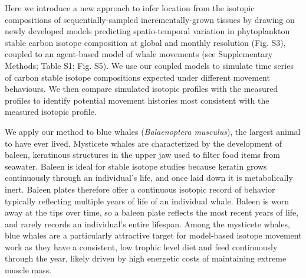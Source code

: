 \documentclass[a4paper,12pt]{article}
\begin{document}
Here we introduce a new approach to infer location from the isotopic compositions of sequentially-sampled incrementally-grown tissues by drawing on newly developed models predicting spatio-temporal variation in phytoplankton stable carbon isotope composition at global and monthly resolution\cite{magozzi2017using} (Fig. S3), coupled to an agent-based model of whale movements (see Supplementary Methods; Table S1; Fig. S5).
We use our coupled models to simulate time series of carbon stable isotope compositions expected under different movement behaviours. 
We then compare simulated isotopic profiles with the measured profiles to identify potential movement histories most consistent with the measured isotopic profile.

We apply our method to blue whales (\textit{Balaenoptera musculus}), the largest animal to have ever lived. 
Mysticete whales are characterized by the development of baleen, keratinous structures in the upper jaw used to filter food items from seawater. 
Baleen is ideal for stable isotope studies because keratin grows continuously through an individual's life, and once laid down it is metabolically inert\cite{best1996stable,hobson1998stable}. 
Baleen plates therefore offer a continuous isotopic record of behavior typically reflecting multiple years of life of an individual whale. 
Baleen is worn away at the tips over time, so a baleen plate reflects the most recent years of life, and rarely records an individual's entire lifespan. 
Among the mysticete whales, blue whales are a particularly attractive target for model-based isotope movement work as they have a consistent, low trophic level diet and feed continuously through the year, likely driven by high energetic costs of maintaining extreme muscle mass\cite{goldbogen2015}.
\end{document}
